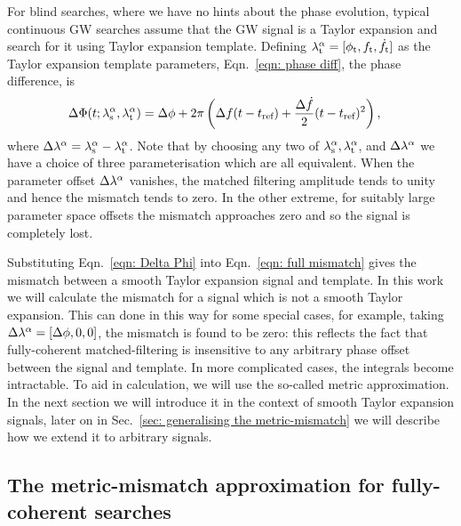 \documentclass[../full_thesis/full_thesis.tex]{subfiles}
\begin{document}
For blind searches, where we have no hints about the phase evolution,
typical continuous GW searches assume that the GW signal is a Taylor expansion and
search for it using Taylor expansion template. Defining ${\lambda}_\textrm{t}^{\alpha} = [\phi_{\textrm{t}},
{f_{\textrm{t}}}, \dot{f}_{\textrm{t}}]$ as the Taylor expansion
template parameters, Eqn.~\eqref{eqn: phase diff}, the phase difference, is
\begin{align}
\Delta \Phi(t; {\lambda}_\textrm{s}^{\alpha}, {\lambda}_\textrm{t}^{\alpha})  & =
\Delta\phi + 2\pi\left(\Delta f(t-t_{\textrm{ref}}) +
\frac{\Delta\dot{f}}{2}(t - t_{\textrm{ref}})^{2}\right),
\label{eqn: Delta Phi}
\end{align}
where $\Delta\lambda^{\alpha} = {\lambda}_\textrm{s}^{\alpha} - {\lambda}_\textrm{t}^{\alpha}$. Note that
by choosing any two of ${\lambda}_\textrm{s}^{\alpha}, {\lambda}_\textrm{t}^{\alpha}$, and $\Delta\lambda^{\alpha}$
we have a choice of three parameterisation which are all equivalent.
When the parameter offset $\Delta\lambda^{\alpha}$ vanishes, the matched filtering
amplitude tends to unity and hence the mismatch tends to zero. In the other
extreme, for suitably
large parameter space offsets the mismatch approaches zero and so the signal is
completely lost.

Substituting Eqn.~\eqref{eqn: Delta Phi} into Eqn.~\eqref{eqn: full mismatch}
gives the mismatch between a smooth Taylor expansion signal and template. In
this work we will calculate the mismatch for a signal which is not a smooth
Taylor expansion. This can done in this way for some special cases, for
example, taking $\Delta\lambda^{\alpha} = [\Delta\phi, 0, 0]$, the mismatch is found to be
zero: this reflects the fact that fully-coherent matched-filtering is
insensitive to any arbitrary phase offset between the signal and template. In
more complicated cases, the integrals become intractable. To aid in
calculation, we will use the so-called metric approximation. In the next section
we will introduce it in the context of smooth Taylor expansion signals, later on
in Sec.~\ref{sec: generalising the metric-mismatch} we will describe how we
extend it to arbitrary signals.

\subsection{The metric-mismatch approximation for fully-coherent searches}
\label{sec: the metric-mismatch approximation for fully-coherent searches}
\end{document}

